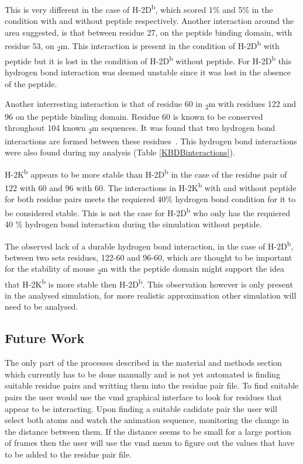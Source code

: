 \documentclass[11pt,twocolumn]{article}
\newcommand{\db}{H-2D\textsuperscript{b}\xspace}
\newcommand{\kb}{H-2K\textsuperscript{b}\xspace}
\newcommand{\btm}{\textbeta\textsubscript{2}m\xspace}
\begin{document}
This is very different in the case of \db, which scored 1\% and 5\% in the
condition with and without peptide respectively. Another interaction around the
area suggested, is that between  residue 27, on the peptide binding domain,
with residue 53, on \btm. This interaction  is present in the condition of \db
with peptide but it is lost in the condition of \db without peptide. For \db
this hydrogen bond interaction was deemed unstable since it was lost in the
absence of the peptide.  

Another interresting interaction is that of residue 60 in \btm with residues
122 and 96 on the peptide binding domain. Residue 60 is known to be conserved
throughout 104 known \btm sequences. It was found that two hydrogen bond
interactions are formed between these residues~\cite{achour2006structural}.
This hydrogen bond interactions were also found during my analysis (Table
\ref{KBDBinteractions}). 

\kb appears to be more stable than \db in the case of the residue pair of 122
with 60 and 96 with 60. The  interactions in \kb with and without peptide for
both residue pairs meets the requiered 40\% hydrogen bond condition for it to
be considered stable. This is not the case for \db who only has the requiered
40 \% hydrogen bond interaction during the simulation without peptide.


The observed lack of a durable hydrogen bond interaction, in the case of \db,
between two sets residues, 122-60 and 96-60, which are thought to be important
for the stability of mouse \btm with the peptide domain might support the idea
that \kb is more stable then \db. This observation however is only present in
the analysed simulation, for more realistic approximation other simulation will
need to be analysed.  

\subsection*{Future Work}

The only part of the processes described in the material and methods section
which currently has to be done manually and is not yet automated is finding
suitable residue pairs and writting them into the residue pair file. To find
suitable pairs the user would use the vmd graphical interface to look for
residues that appear to be interacting. Upon finding a suitable cadidate pair
the user will select both atoms and watch the animation sequence, monitoring
the change in the distance between them. If the distance seems to be small for
a large portion of frames then the user will use the vmd menu to figure out the
values that have to be added to the residue pair file.
\end{document}
